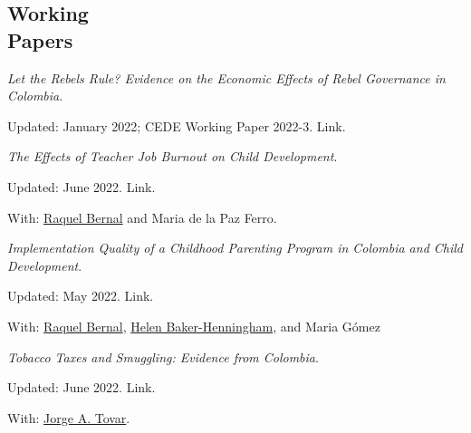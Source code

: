 \documentclass[margin,line]{res}
\newenvironment{list1}{
  \begin{list}{\ding{113}}{%
      \setlength{\itemsep}{0in}
      \setlength{\parsep}{0in} \setlength{\parskip}{0in}
      \setlength{\topsep}{0in} \setlength{\partopsep}{0in} 
      \setlength{\leftmargin}{0.17in}}}{\end{list}}
\begin{document}
\begin{resume}




\vspace{.1cm}

\section{\sc Working \\ Papers}

\textit{Let the Rebels Rule? Evidence on the Economic Effects of Rebel Governance in Colombia}.
\begin{list1}
    \item[] Updated: January 2022; CEDE Working Paper 2022-3. Link. 
\end{list1}

\textit{The Effects of Teacher Job Burnout on Child Development}.
\begin{list1}
    \item[] Updated: June 2022. Link. 
    \item[] With: \href{https://sites.google.com/view/raquelbernal/home}{Raquel Bernal} and Maria de la Paz Ferro.  
\end{list1}

\textit{Implementation Quality of a Childhood Parenting Program in Colombia and Child Development}.
\begin{list1}
    \item[] Updated: May 2022. Link. 
    \item[] With: \href{https://sites.google.com/view/raquelbernal/home}{Raquel Bernal}, \href{https://research.bangor.ac.uk/portal/en/researchers/helen-henningham(ab5999a9-22af-4394-b4f4-89dff9971ad1).html}{Helen Baker-Henningham}, and Maria Gómez  
\end{list1}

\textit{Tobacco Taxes and Smuggling: Evidence from Colombia}.
\begin{list1}
    \item[] Updated: June 2022. Link. 
    \item[] With: \href{https://sites.google.com/view/jorgetovar/home}{Jorge A. Tovar}.
\end{list1}



\end{resume}
\end{document}
